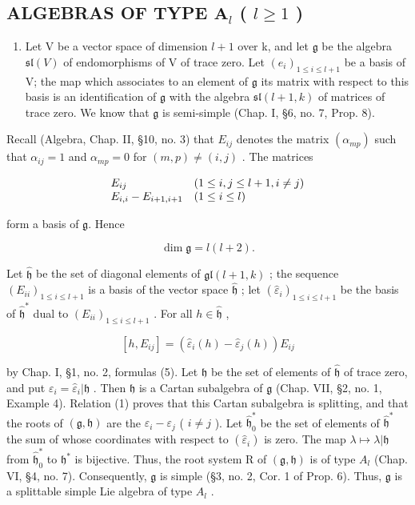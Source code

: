 \subsection{\texorpdfstring{ALGEBRAS OF TYPE \(\mathbf{A}_l\) ( \(l \geq 1\) )}{ALGEBRAS OF TYPE \textbackslash mathbf\{A\}\_l ( l \textbackslash geq 1 )}}

\begin{enumerate}
\def\labelenumi{(\Roman{enumi})}
\tightlist
\item
  Let V be a vector space of dimension \(l+1\) over k, and let \(\mathfrak{g}\) be the algebra \(\mathfrak{sl}(V)\) of endomorphisms of V of trace zero. Let \((e_{i})_{1\leq i\leq l+1}\) be a basis of V; the map which associates to an element of \(\mathfrak{g}\) its matrix with respect to this basis is an identification of \(\mathfrak{g}\) with the algebra \(\mathfrak{sl}(l+1,k)\) of matrices of trace zero. We know that \(\mathfrak{g}\) is semi-simple (Chap. I, §6, no. 7, Prop. 8).
\end{enumerate}

Recall (Algebra, Chap. II, §10, no. 3) that \(E_{ij}\) denotes the matrix \((\alpha_{mp})\) such that \(\alpha_{ij} = 1\) and \(\alpha_{mp} = 0\) for \((m,p) \neq (i,j)\) . The matrices

\[
\begin{array}{l l} E _ {i j} & (1 \leq i, j \leq l + 1, i \neq j) \\ E _ {i, i} - E _ {i + 1, i + 1} & (1 \leq i \leq l) \end{array}
\]

form a basis of \(\mathfrak{g}\). Hence

\[
\dim \mathfrak {g} = l (l + 2).
\]

Let \(\hat{\mathfrak{h}}\) be the set of diagonal elements of \(\mathfrak{gl}(l + 1,k)\) ; the sequence \((E_{ii})_{1\leq i\leq l + 1}\) is a basis of the vector space \(\hat{\mathfrak{h}}\) ; let \((\hat{\varepsilon}_i)_{1\leq i\leq l + 1}\) be the basis of \(\hat{\mathfrak{h}}^*\) dual to \((E_{ii})_{1\leq i\leq l + 1}\) . For all \(h\in \hat{\mathfrak{h}}\) ,

\[
[ h, E _ {i j} ] = (\hat {\varepsilon} _ {i} (h) - \hat {\varepsilon} _ {j} (h)) E _ {i j}\tag{1}
\]

by Chap. I, §1, no. 2, formulas (5). Let \(\mathfrak{h}\) be the set of elements of \(\hat{\mathfrak{h}}\) of trace zero, and put \(\varepsilon_i = \hat{\varepsilon}_i|\mathfrak{h}\) . Then \(\mathfrak{h}\) is a Cartan subalgebra of \(\mathfrak{g}\) (Chap. VII, §2, no. 1, Example 4). Relation (1) proves that this Cartan subalgebra is splitting, and that the roots of \((\mathfrak{g},\mathfrak{h})\) are the \(\varepsilon_i - \varepsilon_j\) ( \(i\neq j\) ). Let \(\hat{\mathfrak{h}}_0^*\) be the set of elements of \(\hat{\mathfrak{h}}^*\) the sum of whose coordinates with respect to \((\hat{\varepsilon}_i)\) is zero. The map \(\lambda \mapsto \lambda |\mathfrak{h}\) from \(\hat{\mathfrak{h}}_0^*\) to \(\mathfrak{h}^*\) is bijective. Thus, the root system R of \((\mathfrak{g},\mathfrak{h})\) is of type \(A_l\) (Chap. VI, §4, no. 7). Consequently, \(\mathfrak{g}\) is simple (§3, no. 2, Cor. 1 of Prop. 6). Thus, \(\mathfrak{g}\) is a splittable simple Lie algebra of type \(A_l\) .

